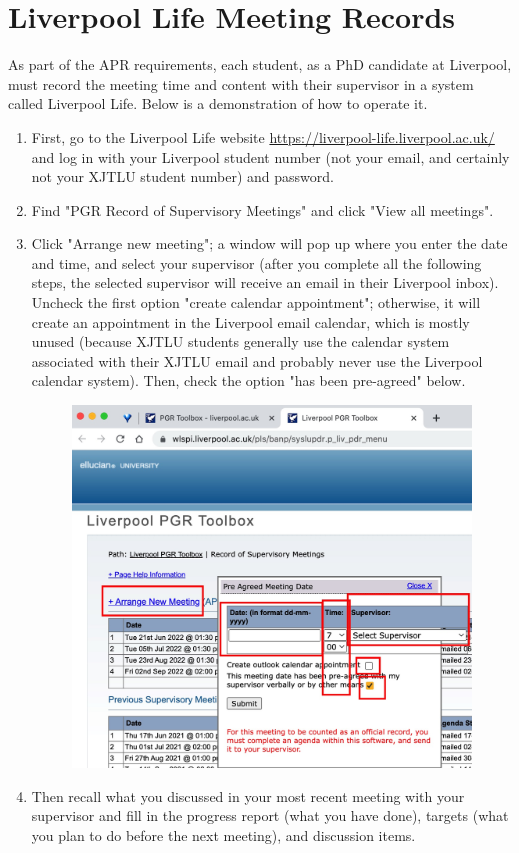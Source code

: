 \section{Liverpool Life Meeting Records}
\label{sec.meeting_record}
As part of the APR requirements, each student, as a PhD candidate at Liverpool, must record the meeting time and content with their supervisor in a system called Liverpool Life. Below is a demonstration of how to operate it.

\begin{enumerate}
    \item First, go to the Liverpool Life website \url{https://liverpool-life.liverpool.ac.uk/} and log in with your Liverpool student number (not your email, and certainly not your XJTLU student number) and password.
    \item Find "PGR Record of Supervisory Meetings" and click "View all meetings".
    \item Click "Arrange new meeting"; a window will pop up where you enter the date and time, and select your supervisor (after you complete all the following steps, the selected supervisor will receive an email in their Liverpool inbox). Uncheck the first option "create calendar appointment"; otherwise, it will create an appointment in the Liverpool email calendar, which is mostly unused (because XJTLU students generally use the calendar system associated with their XJTLU email and probably never use the Liverpool calendar system). Then, check the option "has been pre-agreed" below.
    \begin{figure}[H]
        \centering
        \includegraphics[width=0.5\columnwidth]{author-folder/Kai.Wu/meeting_record_figures/arange_new_meeting.jpg}
    \end{figure}
    \item Then recall what you discussed in your most recent meeting with your supervisor and fill in the progress report (what you have done), targets (what you plan to do before the next meeting), and discussion items.

\end{enumerate}
